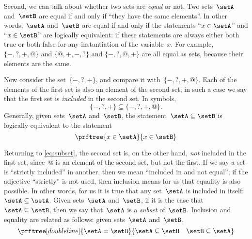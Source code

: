 Second, we can talk about whether two sets are \emph{equal} or not.
Two sets~$\setA$ and~$\setB$ are equal if and only if ``they have the same elements''.
In other words,~$\setA$ and~$\setB$ are equal if and only if the statements
``$x \in \setA$'' and ``$x \in \setB$'' are logically equivalent: if these statements are always either both true or both false for any instantiation of the variable~$x$.
For example, $\{ -, ?, +, @ \}$ and $\{ @, +, -, ?\}$ and $\{ -, ?, @, + \}$ are all equal as sets, because their elements are the same.

Now consider the set~$\{ -, ?, + \}$, and compare it with~$\{ -, ?, +, @ \}$.
Each of the elements of the first set is also an element of the second set; in such a case we say that the first set is \emph{included} in the second set.
In symbols,
%
\begin{equation}
    \label{eq:subset}
    \{ -, ?, + \} \subseteq \{ -, ?, +, @ \}.
\end{equation}
%
Generally, given sets~$\setA$ and~$\setB$, the statement~$\setA \subseteq \setB$ is logically equivalent to the statement
%
\begin{equation*}
    \prftree{x \in \setA}{ x \in \setB}
\end{equation*}

Returning to \cref{eq:subset}, the second set is, on the other hand, \emph{not} included in the first set, since~$@$ is an element of the second set, but not the first.
If we say a set is ``strictly included'' in another, then we mean ``included in and not equal'';
if the adjective ``strictly'' is not used, then inclusion means for us that equality is also possible.
In other words, for us it is true that any set~$\setA$ is included in itself:~$\setA \subseteq \setA$.
Given sets~$\setA$ and~$\setB$, if it is the case that~$\setA \subseteq \setB$, then we say that~$\setA$ is a \emph{subset} of~$\setB$.
Inclusion and equality are related as follows: given sets~$\setA$ and~$\setB$,
\begin{equation*}
    \prftree[double line]{\setA = \setB}{{\setA \subseteq \setB}\quad{\setB \subseteq \setA}}
\end{equation*}

